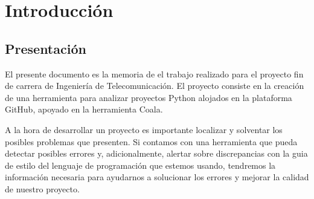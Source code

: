 \documentclass[a4paper, 12pt]{book}
\begin{document}


\tableofcontents 
\cleardoublepage
\listoffigures %



\cleardoublepage
\chapter{Introducción}
\label{sec:intro} %

\section{Presentación}
\label{sec:presentacion}
El presente documento es la memoria de el trabajo realizado para el proyecto fin de carrera de Ingeniería de Telecomunicación. El proyecto consiste en la creación de una herramienta para analizar proyectos Python alojados en la plataforma GitHub, apoyado en la herramienta Coala.

A la hora de desarrollar un proyecto es importante localizar y solventar los posibles problemas que presenten. Si contamos con una herramienta que pueda detectar posibles errores y, adicionalmente, alertar sobre discrepancias con la guia de estilo del lenguaje de programación que estemos usando, tendremos la información necesaria para ayudarnos a solucionar los errores y mejorar la calidad de nuestro proyecto.
\end{document}
